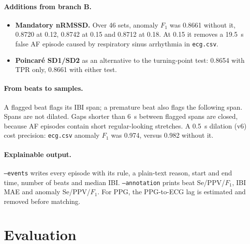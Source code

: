 \documentclass[10pt,a4paper]{article}
\newcommand{\code}[1]{\texttt{#1}}
\begin{document}
\paragraph{Additions from branch B.}
\begin{itemize}
  \item \textbf{Mandatory nRMSSD.} Over 46 sets, anomaly $F_1$ was 0.8661 without it, 0.8720 at 0.12, 0.8742 at 0.15
        and 0.8712 at 0.18. At 0.15 it removes a \SI{19.5}{s} false AF episode caused by respiratory sinus arrhythmia
        in \code{ecg.csv}.
  \item \textbf{Poincar\'e SD1/SD2} as an alternative to the turning-point test: 0.8654 with TPR only, 0.8661 with
        either test.
\end{itemize}

\paragraph{From beats to samples.}
A flagged beat flags its IBI span; a premature beat also flags the following span. Spans are not dilated. Gaps shorter
than \SI{6}{s} between flagged spans are closed, because AF episodes contain short regular-looking stretches. A
\SI{0.5}{s} dilation (v6) cost precision: \code{ecg.csv} anomaly $F_1$ was 0.974, versus 0.982 without it.

\paragraph{Explainable output.}
\code{--events} writes every episode with its rule, a plain-text reason, start and end time, number of beats and median
IBI. \code{--annotation} prints beat Se/PPV/$F_1$, IBI MAE and anomaly Se/PPV/$F_1$. For PPG, the PPG-to-ECG lag is
estimated and removed before matching.

\section{Evaluation}\label{sec:eval}
\end{document}
